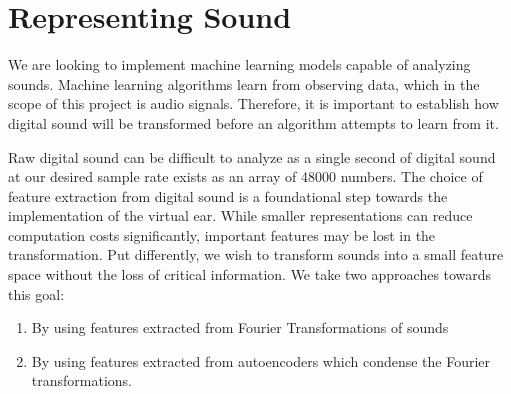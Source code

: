 \documentclass[\main/thesis.tex]{subfiles}
\begin{document}
\section{Representing Sound}
\label{chap:represent_sound}
We are looking to implement machine learning models capable of analyzing sounds. Machine learning algorithms learn from observing data, which in the scope of this project is audio signals. Therefore, it is important to establish how digital sound will be transformed before an algorithm attempts to learn from it. 

Raw digital sound can be difficult to analyze as a single second of digital sound at our desired sample rate exists as an array of 48000 numbers. The choice of feature extraction from digital sound is a foundational step towards the implementation of the virtual ear. While smaller representations can reduce computation costs significantly, important features may be lost in the transformation. Put differently, we wish to transform sounds into a small feature space without the loss of critical information. We take two approaches towards this goal: \begin{enumerate}
    \item By using features extracted from Fourier Transformations of sounds \item By using features extracted from autoencoders which condense the Fourier transformations. 
\end{enumerate}
\end{document}

